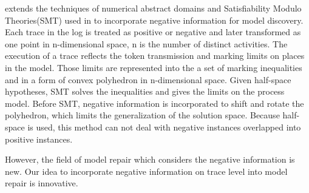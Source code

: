 \cite{ponce2016incorporating} extends the techniques of numerical abstract domains and Satisfiability Modulo Theories(SMT) used in \cite{carmona2014process} to incorporate negative information for model discovery. Each trace in the log is treated as positive or negative and later transformed as one point in n-dimensional space, n is the number of distinct activities. The execution of a trace reflects the token transmission and marking limits on places in the model. Those limits are represented into the a set of marking inequalities and in a form of convex polyhedron in n-dimensional space. Given half-space hypotheses, SMT solves the inequalities and gives the limits on the process model. Before SMT, negative information is incorporated to shift and rotate the polyhedron, which limits the generalization of the solution space. Because half-space is used, this method can not deal with negative instances overlapped into positive instances.

However, the field of model repair which considers the negative information is new. Our idea to incorporate negative information on trace level into model repair is innovative.  

\iffalse
Compared to this, our approach is innovative mainly in the following aspects. 
\begin{itemize}
	\item Incorporate the negative information into model repair. 
	\item Analyze the long-term dependency in the model to provide a preciser result. 
	\item Analyze Model on Trace level. All activities constituting a trace are considered. 
\end{itemize}
\fi